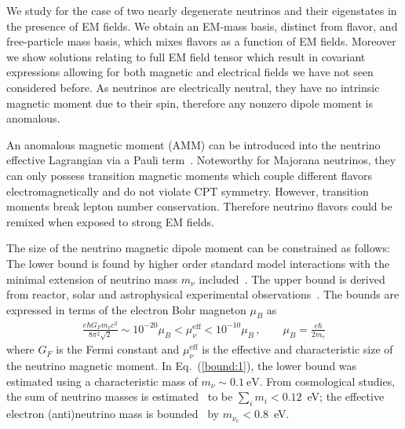 \documentclass[addchapnum]{ws-rv961x669} %
\newcommand{\req}[1]{Eq.~(\ref{#1})}
\begin{document}
We study for the case of two nearly degenerate neutrinos and their eigenstates in the presence of EM fields. We obtain an EM-mass basis, distinct from flavor, and free-particle mass basis, which mixes flavors as a function of EM fields. Moreover we show solutions relating to full EM field tensor which result in covariant expressions allowing for both magnetic and electrical fields we have not seen considered before. As neutrinos are electrically neutral, they have no intrinsic magnetic moment due to their spin, therefore any nonzero dipole moment is anomalous. 

An anomalous magnetic moment (AMM) can be introduced into the neutrino effective Lagrangian via a Pauli term~\cite{Steinmetz:2018ryf,Itzykson:1980rh,Schwartz:2014sze}. Noteworthy for Majorana neutrinos, they can only possess transition magnetic moments which couple different flavors electromagnetically and do not violate CPT symmetry. However, transition moments break lepton number conservation. Therefore neutrino flavors could be remixed when exposed to strong EM fields.

The size of the neutrino magnetic dipole moment can be constrained as follows: The lower bound is found by higher order standard model interactions with the minimal extension of neutrino mass $m_{\nu}$ included~\cite{Fujikawa:1980yx,Shrock:1980vy,Shrock:1982sc}. The upper bound is derived from reactor, solar and astrophysical experimental observations~\cite{Giunti:2015gga,Canas:2015yoa,Studenikin:2016ykv,AristizabalSierra:2021fuc}. The bounds are expressed in terms of the electron Bohr magneton $\mu_{B}$ as
\begin{align}
\label{bound:1}
\frac{e\hbar G_{F}m_{\nu}c^{2}}{8\pi^{2}\sqrt{2}} \sim 10^{-20}\mu_{B}<\mu_{\nu}^\mathrm{eff}<10^{-10}\mu_{B}\,,\qquad\mu_{B}=\frac{e\hbar}{2m_{e}}
\end{align}
where $G_{F}$ is the Fermi constant and $\mu_{\nu}^\mathrm{eff}$ is the effective and characteristic size of the neutrino magnetic moment. In \req{bound:1}, the lower bound was estimated using a characteristic mass of $m_{\nu}\sim0.1~\mathrm{eV}$. From cosmological studies, the sum of neutrino masses is estimated~\cite{Planck:2018vyg} to be $\sum_{i}m_{i}<0.12$~eV; the effective electron (anti)neutrino mass is bounded~\cite{KATRIN:2021uub} by $m_{\nu_{e}}<0.8$~eV.

\end{document}
